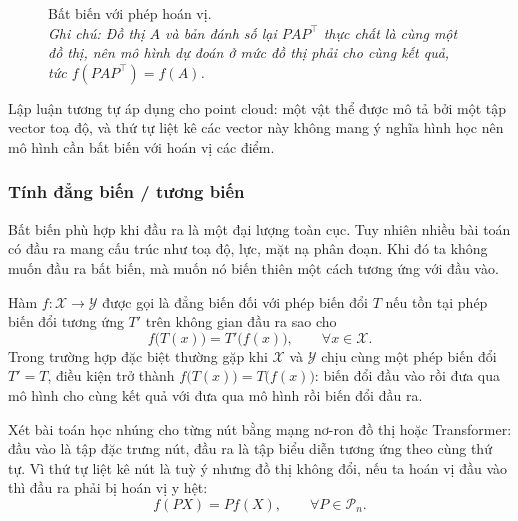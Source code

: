 \begin{example}
\begin{figure}[!htbp]
\caption[Bất biến với phép hoán vị]{Bất biến với phép hoán vị.\protect\\[2pt]
\textit{Ghi chú: Đồ thị $A$ và bản đánh số lại $PAP^{\top}$ thực chất là cùng một đồ thị, nên mô hình dự đoán ở mức đồ thị phải cho cùng kết quả, tức $f(PAP^{\top})=f(A)$.}}
\label{fig:bat-bien-do-thi}
\end{figure}
Lập luận tương tự áp dụng cho point cloud: một vật thể được mô tả bởi một tập vector toạ độ, và thứ tự liệt kê các vector này không mang ý nghĩa hình học nên mô hình cần bất biến với hoán vị các điểm.
\end{example}
 
\subsubsection{Tính đẳng biến / tương biến}
\label{ssub:equivariance}
 
Bất biến phù hợp khi đầu ra là một đại lượng toàn cục. Tuy nhiên nhiều bài toán có đầu ra mang cấu trúc như toạ độ, lực, mặt nạ
phân đoạn. Khi đó ta không muốn đầu ra bất biến, mà muốn nó biến thiên một cách tương ứng với đầu vào.
 
\begin{definition}
\label{def:dang-bien}
Hàm $f:\mathcal{X}\to\mathcal{Y}$ được gọi là đẳng biến đối với phép biến đổi $T$ nếu tồn tại phép biến đổi tương ứng $T'$ trên không
gian đầu ra sao cho
\begin{equation}
\label{eq:equivariance}
f\bigl(T(x)\bigr) = T'\bigl(f(x)\bigr), \qquad \forall x\in\mathcal{X}.
\end{equation}
Trong trường hợp đặc biệt thường gặp khi $\mathcal{X}$ và $\mathcal{Y}$ chịu
cùng một phép biến đổi $T'=T$, điều kiện trở thành
$f\bigl(T(x)\bigr)=T\bigl(f(x)\bigr)$: biến đổi đầu vào rồi đưa qua mô hình cho cùng kết quả với đưa qua mô hình rồi biến đổi đầu ra.
\end{definition}
 
\begin{example}
\label{vd:node-equiv}
Xét bài toán học nhúng cho từng nút bằng mạng nơ-ron đồ thị hoặc Transformer: đầu vào là tập đặc trưng nút, đầu ra là tập biểu diễn
tương ứng theo cùng thứ tự. Vì thứ tự liệt kê nút là tuỳ ý nhưng đồ thị không đổi, nếu ta hoán vị đầu vào thì đầu ra phải bị hoán vị y hệt:
\begin{equation}
f(PX) = P f(X), \qquad \forall P\in\mathcal{P}_n .
\end{equation}
\end{example}


